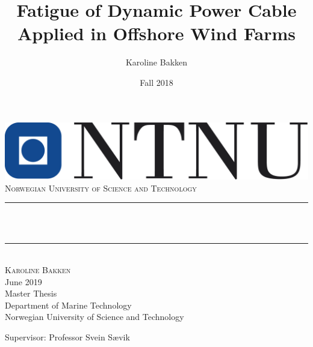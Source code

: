 \documentclass{report}
\title{Fatigue of Dynamic Power Cable Applied in Offshore Wind Farms}								%
\author{Karoline Bakken}								%
\date{Fall 2018}											%
\makeatletter
\let\thetitle\@title
\makeatother
\begin{document}
\begin{titlepage}
	\centering
    \vspace*{0.5 cm}
    \includegraphics[scale = 0.3]{figures/ntnuu}\\[1.0 cm]	%
    \textsc{\LARGE Norwegian University of Science \newline\newline and Technology}\\[2.0 cm]	%
	\rule{\linewidth}{0.2 mm} \\[0.4 cm]
	{\huge \bfseries \thetitle}\\
	\rule{\linewidth}{0.2 mm} \\[1.5 cm]
	
	\textsc{\Large Karoline Bakken}\\[0.5 cm]
	\Large{June 2019}\\[1.5 cm]
	Master Thesis\\
	Department of Marine Technology \\
	Norwegian University of Science and Technology
	\vfill
		\begin{flushleft} Supervisor: Professor Svein Sævik
		\end{flushleft}
	 
	 
	 

    
    
    
    
	
\end{titlepage}
\end{document}
